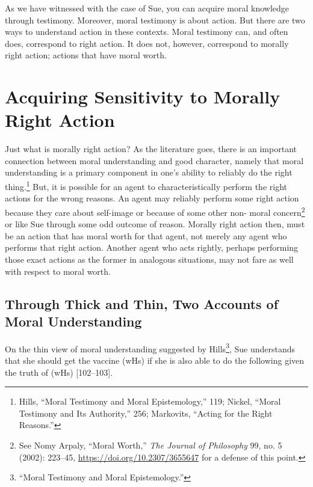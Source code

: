 \documentclass[phdthesis,12pt,final,a4paper]{wuthesis}
\theoremstyle{definition}
\theoremstyle{definition}
\theoremstyle{definition}
\theoremstyle{definition}
\theoremstyle{remark}
\begin{document}
As we have witnessed with the case of Sue, you can acquire moral knowledge through testimony. Moreover, moral testimony is about action. But there are two ways to understand action in these contexts. Moral testimony can, and often does, correspond to right action. It does not, however, correspond to morally right action; actions that have moral worth.

\section{Acquiring Sensitivity to Morally Right Action}\label{acquiring-sensitivity-to-morally-right-action}

Just what is morally right action? As the literature goes, there is an important connection between moral understanding and good character, namely that moral understanding is a primary component in one's ability to reliably do the right thing.\footnote{Hills, {``Moral Testimony and Moral Epistemology,''} 119; Nickel, {``Moral {Testimony} and Its {Authority},''} 256; Markovits, {``Acting for the {Right Reasons}.''}} But, it is possible for an agent to characteristically perform the right actions for the wrong reasons. An agent may reliably perform some right action because they care about self-image or because of some other non- moral concern\footnote{See Nomy Arpaly, {``Moral {Worth},''} \emph{The Journal of Philosophy} 99, no. 5 (2002): 223--45, \url{https://doi.org/10.2307/3655647} for a defense of this point.} or like Sue through some odd outcome of reason. Morally right action then, must be an action that has moral worth for that agent, not merely any agent who performs that right action. Another agent who acts rightly, perhaps performing those exact actions as the former in analogous situations, may not fare as well with respect to moral worth.

\subsection*{Through Thick and Thin, Two Accounts of Moral Understanding}\label{through-thick-and-thin-two-accounts-of-moral-understanding}

On the thin view of moral understanding suggested by Hills\footnote{{``Moral Testimony and Moral Epistemology.''}}, Sue understands that she should get the vaccine (wHs) if she is also able to do the following given the truth of (wHs) {[}102--103{]}.
\end{document}
